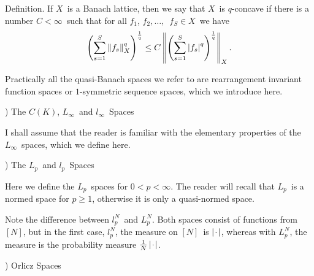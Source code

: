 \proclaim Definition. If $X$\ is a
Banach lattice, then we say that $X$\ is
{\dt $q$-concave} if there is a number
$C<\infty$\ such that for all $f_1$,
$f_2,\ldots,$\ $f_S\in X$\ we have
$$ \left(\sum_{s=1}^S\left\| f_s \right\|_X^q\right)^{1\over q}
\le C \left\| \left(\sum_{s=1}^S\left| f_s\right|^q
   \right)^{1\over q} \right\|_X .$$
 
Practically all the quasi-Banach spaces
we refer to are rearrangement invariant
function spaces or $1$-symmetric sequence spaces, which we introduce here.
 
) The $C(K)$, $L_\infty$\ and $l_\infty$\ Spaces
 
I shall assume that the reader is familiar
with the elementary properties of
the $L_\infty$\ spaces, which we define here.
 
 
) The $L_p$\ and $l_p$\ Spaces
 
Here we define the $L_p$\ spaces for
$0<p<\infty$. The reader will recall that
$L_p$\ is a normed space for $p\ge1$, otherwise it is only a quasi-normed
space.
 
 
Note the difference between $l_p^N$\ and $L_p^N$. Both spaces consist of
functions from $[N]$, but in the first
case, $l_p^N$, the measure on $[N]$\ is
$\left| \kern0.8pt\cdot\kern0.8pt \right|$, whereas with $L_p^N$, the measure is the probability measure
${1\over N}\left| \kern0.8pt\cdot\kern0.8pt \right|$.
 
) Orlicz Spaces
 
